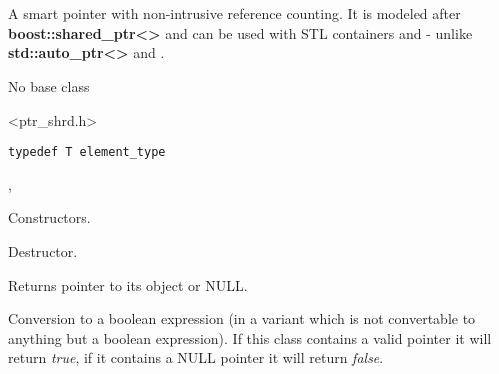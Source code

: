 \section{}\label{wxsharedptr}

A smart pointer with non-intrusive reference counting. It is modeled
after {\bf boost::shared\_ptr<>} and can be used with STL containers 
and  - unlike {\bf std::auto\_ptr<>}
and .


No base class


<ptr\_shrd.h>


{\small%
\begin{verbatim}
typedef T element_type
\end{verbatim}
}%


, 




\label{wxsharedptrwxsharedptr}



Constructors.

\label{wxsharedptrdtor}


Destructor.

\label{wxsharedptrget}


Returns pointer to its object or NULL.

\label{wxsharedptroperatorbool}


Conversion to a boolean expression (in a variant which is not 
convertable to anything but a boolean expression). If this class
contains a valid pointer it will return {\it true}, if it contains
a NULL pointer it will return {\it false}.

